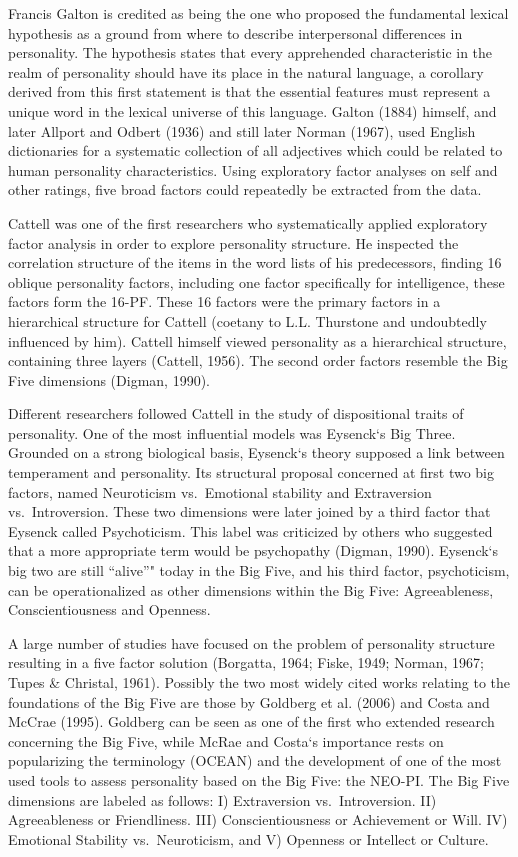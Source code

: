 \documentclass[,man,floatsintext]{apa6}
\theoremstyle{definition}
\theoremstyle{definition}
\theoremstyle{definition}
\theoremstyle{remark}
\begin{document}
Francis Galton is credited as being the one who proposed the fundamental
lexical hypothesis as a ground from where to describe interpersonal
differences in personality. The hypothesis states that every apprehended
characteristic in the realm of personality should have its place in the
natural language, a corollary derived from this first statement is that
the essential features must represent a unique word in the lexical
universe of this language. Galton (1884) himself, and later Allport and
Odbert (1936) and still later Norman (1967), used English dictionaries
for a systematic collection of all adjectives which could be related to
human personality characteristics. Using exploratory factor analyses on
self and other ratings, five broad factors could repeatedly be extracted
from the data.

Cattell was one of the first researchers who systematically applied
exploratory factor analysis in order to explore personality structure.
He inspected the correlation structure of the items in the word lists of
his predecessors, finding 16 oblique personality factors, including one
factor specifically for intelligence, these factors form the 16-PF.
These 16 factors were the primary factors in a hierarchical structure
for Cattell (coetany to L.L. Thurstone and undoubtedly influenced by
him). Cattell himself viewed personality as a hierarchical structure,
containing three layers (Cattell, 1956). The second order factors
resemble the Big Five dimensions (Digman, 1990).

Different researchers followed Cattell in the study of dispositional
traits of personality. One of the most influential models was Eysenck`s
Big Three. Grounded on a strong biological basis, Eysenck`s theory
supposed a link between temperament and personality. Its structural
proposal concerned at first two big factors, named Neuroticism
vs.~Emotional stability and Extraversion vs.~Introversion. These two
dimensions were later joined by a third factor that Eysenck called
Psychoticism. This label was criticized by others who suggested that a
more appropriate term would be psychopathy (Digman, 1990). Eysenck`s big
two are still \enquote{alive}" today in the Big Five, and his third
factor, psychoticism, can be operationalized as other dimensions within
the Big Five: Agreeableness, Conscientiousness and Openness.

A large number of studies have focused on the problem of personality
structure resulting in a five factor solution (Borgatta, 1964; Fiske,
1949; Norman, 1967; Tupes \& Christal, 1961). Possibly the two most
widely cited works relating to the foundations of the Big Five are those
by Goldberg et al. (2006) and Costa and McCrae (1995). Goldberg can be
seen as one of the first who extended research concerning the Big Five,
while McRae and Costa`s importance rests on popularizing the terminology
(OCEAN) and the development of one of the most used tools to assess
personality based on the Big Five: the NEO-PI. The Big Five dimensions
are labeled as follows: I) Extraversion vs.~Introversion. II)
Agreeableness or Friendliness. III) Conscientiousness or Achievement or
Will. IV) Emotional Stability vs.~Neuroticism, and V) Openness or
Intellect or Culture.
\end{document}

